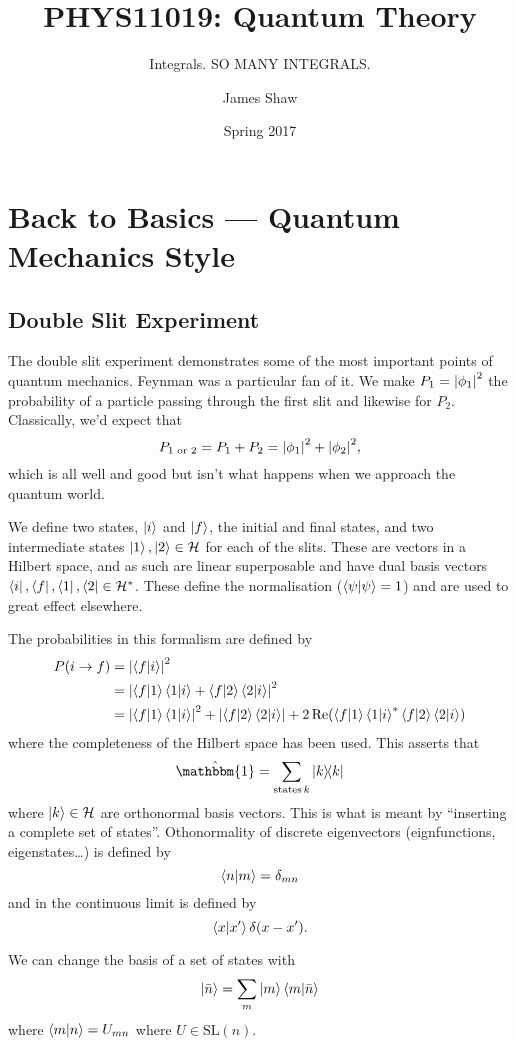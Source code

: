 \documentclass[]{revision-notes}
\title{PHYS11019: Quantum Theory}
\subtitle{Integrals. SO MANY INTEGRALS.}
\author{James Shaw}
\date{Spring 2017}
\begin{document}


\tableofcontents %

\chapter{Back to Basics --- Quantum Mechanics Style}
\section{Double Slit Experiment}

The double slit experiment demonstrates some of the most important points of quantum mechanics.
Feynman was a particular fan of it. We make $P_1 = \abs{\phi_1}^2$ the probability of a particle passing through the first slit and likewise for $P_2$.
Classically, we'd expect that $$P_{1\text{ or }2} = P_1 + P_2 = \abs{\phi_1}^2 + \abs{\phi_2}^2,$$ which is all well and good but isn't what happens when we approach the quantum world.

We define two states, $\ket{i}$ and $\ket{f}$, the initial and final states, and two intermediate states $\ket{1}, \ket{2} \in \mathcal{H}$ for each of the slits.
These are vectors in a Hilbert space, and as such are linear superposable and have dual basis vectors $\bra{i}, \bra{f}, \bra{1}, \bra{2} \in \mathcal{H}^\ast$.
These define the normalisation ($\braket{\psi} = 1$) and are used to great effect elsewhere.

The probabilities in this formalism are defined by
\begin{align*}
  P(i \to f) &= \abs{\bra{f}\ket{i}}^2\\
   &= \abs{\bra{f}\ket{1}\bra{1}\ket{i} + \bra{f}\ket{2}\bra{2}\ket{i}}^2\\
  &= \abs{\bra{f}\ket{1}\bra{1}\ket{i}}^2 + \abs{\bra{f}\ket{2}\bra{2}\ket{i}} + 2 \Re(\bra{f}\ket{1}\bra{1}\ket{i}^\ast \bra{f}\ket{2}\bra{2}\ket{i})
\end{align*}
where the completeness of the Hilbert space has been used.
This asserts that \[ \hat{\mathbbm{1}} = \sum_{\text{states}\, k} \dyad{k}\] where \( \ket{k}\in\mathcal{H} \) are orthonormal basis vectors.
This is what is meant by ``inserting a complete set of states''.
Othonormality of discrete eigenvectors (eignfunctions, eigenstates\ldots) is defined by \[ \braket{n}{m} = \delta_{mn}\] and in the continuous limit is defined by \[\braket{x}{x^\prime} \delta(x-x^\prime).\]

We can change the basis of a set of states with \[\ket{\bar{n}} = \sum_{m} \ket{m}\braket{m}{\bar{n}} \] where \(\braket{m}{n} = U_{mn}\) where $U \in \mathrm{SL}(n)$.
\end{document}
